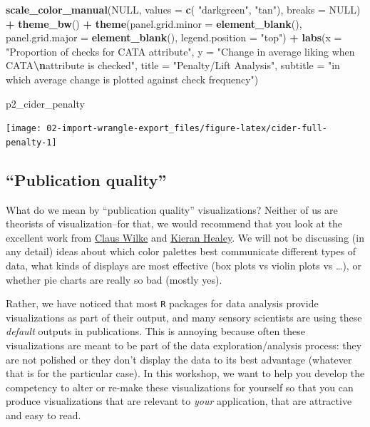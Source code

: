 \documentclass[
]{book}
\newenvironment{Shaded}{\begin{snugshade}}{\end{snugshade}}
\newcommand{\AttributeTok}[1]{\textcolor[rgb]{0.13,0.29,0.53}{#1}}
\newcommand{\ConstantTok}[1]{\textcolor[rgb]{0.56,0.35,0.01}{#1}}
\newcommand{\FunctionTok}[1]{\textcolor[rgb]{0.13,0.29,0.53}{\textbf{#1}}}
\newcommand{\NormalTok}[1]{#1}
\newcommand{\SpecialCharTok}[1]{\textcolor[rgb]{0.81,0.36,0.00}{\textbf{#1}}}
\newcommand{\StringTok}[1]{\textcolor[rgb]{0.31,0.60,0.02}{#1}}
\begin{document}
\begin{Shaded}
\begin{Highlighting}[]
  \FunctionTok{scale\_color\_manual}\NormalTok{(}\ConstantTok{NULL}\NormalTok{, }\AttributeTok{values =} \FunctionTok{c}\NormalTok{( }\StringTok{"darkgreen"}\NormalTok{, }\StringTok{"tan"}\NormalTok{), }\AttributeTok{breaks =} \ConstantTok{NULL}\NormalTok{) }\SpecialCharTok{+} 
  \FunctionTok{theme\_bw}\NormalTok{() }\SpecialCharTok{+} 
  \FunctionTok{theme}\NormalTok{(}\AttributeTok{panel.grid.minor =} \FunctionTok{element\_blank}\NormalTok{(),}
        \AttributeTok{panel.grid.major =} \FunctionTok{element\_blank}\NormalTok{(),}
        \AttributeTok{legend.position =} \StringTok{"top"}\NormalTok{) }\SpecialCharTok{+} 
  \FunctionTok{labs}\NormalTok{(}\AttributeTok{x =} \StringTok{"Proportion of checks for CATA attribute"}\NormalTok{,}
       \AttributeTok{y =} \StringTok{"Change in average liking when CATA}\SpecialCharTok{\textbackslash{}n}\StringTok{attribute is checked"}\NormalTok{,}
       \AttributeTok{title =} \StringTok{"Penalty/Lift Analysis"}\NormalTok{,}
       \AttributeTok{subtitle =} \StringTok{"in which average change is plotted against check frequency"}\NormalTok{)}

\NormalTok{p2\_cider\_penalty}
\end{Highlighting}
\end{Shaded}

\begin{center}\texttt{[image: 02-import-wrangle-export\_files/figure-latex/cider-full-penalty-1]} \end{center}

\hypertarget{publication-quality}{%
\subsection{``Publication quality''}\label{publication-quality}}

What do we mean by ``publication quality'' visualizations? Neither of us are theorists of visualization--for that, we would recommend that you look at the excellent work from \href{https://clauswilke.com/dataviz/}{Claus Wilke} and \href{https://socviz.co/index.html\#preface}{Kieran Healey}. We will not be discussing (in any detail) ideas about which color palettes best communicate different types of data, what kinds of displays are most effective (box plots vs violin plots vs \ldots), or whether pie charts are really so bad (mostly yes).

Rather, we have noticed that most \texttt{R} packages for data analysis provide visualizations as part of their output, and many sensory scientists are using these \emph{default} outputs in publications. This is annoying because often these visualizations are meant to be part of the data exploration/analysis process: they are not polished or they don't display the data to its best advantage (whatever that is for the particular case). In this workshop, we want to help you develop the competency to alter or re-make these visualizations for yourself so that you can produce visualizations that are relevant to \emph{your} application, that are attractive and easy to read.
\end{document}
